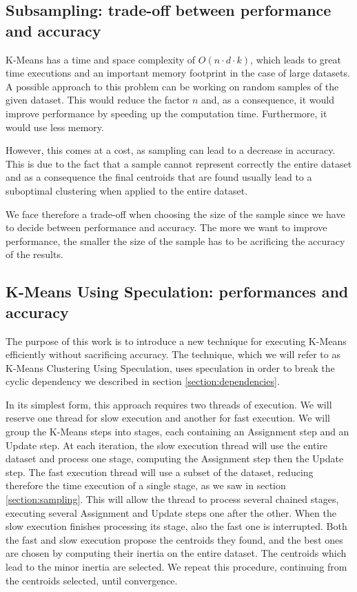 \label{section:dependencies}

\subsection{Subsampling: trade-off between performance and accuracy}

K-Means has a time and space complexity of $O(n\cdot d\cdot k)$, which leads to great time executions and an important memory footprint in the case of large datasets. 
A possible approach to this problem can be working on random samples of the given dataset. This would reduce the factor $n$ and, as a consequence, it would improve performance by speeding up the computation time. Furthermore, it would use less memory. 

However, this comes at a cost, as sampling can lead to a decrease in accuracy. This is due to the fact that a sample cannot represent correctly the entire dataset and as a consequence the final centroids that are found usually lead to a suboptimal clustering when applied to the entire dataset.

We face therefore a trade-off when choosing the size of the sample since we have to decide between performance and accuracy. The more we want to improve performance, the smaller the size of the sample has to be acrificing the accuracy of the results.
\label{section:sampling}

\subsection{K-Means Using Speculation: performances and accuracy}

The purpose of this work is to introduce a new technique for executing K-Means efficiently without sacrificing accuracy. The technique, which we will refer to as K-Means Clustering Using Speculation, uses speculation in order to break the cyclic dependency we described in section \ref{section:dependencies}.

In its simplest form, this approach requires two threads of execution. We will reserve one thread for slow execution and another for fast execution. We will group the K-Means steps into stages, each containing an Assignment step and an Update step. At each iteration, the slow execution thread will use the entire dataset and process one stage, computing the Assignment step then the Update step. The fast execution thread will use a subset of the dataset, reducing therefore the time execution of a single stage, as we saw in section \ref{section:sampling}. This will allow the thread to process several chained stages, executing several Assignment and Update steps one after the other.
When the slow execution finishes processing its stage, also the fast one is interrupted.
Both the fast and slow execution propose the centroids they found, and the best ones are chosen by computing their inertia on the entire dataset. The centroids which lead to the minor inertia are selected.
We repeat this procedure, continuing from the centroids selected, until convergence.

